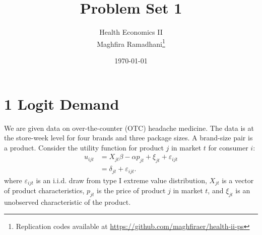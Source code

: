 \documentclass{article}
\begin{document}
 
\title{Problem Set 1}
\author{Health Economics II\\
Maghfira Ramadhani\footnote{Replication codes available at \url{https://github.com/maghfiraer/health-ii-ps}}}
\date{\today}
\maketitle

\section*{1 Logit Demand}

We are given data on over-the-counter (OTC) headache medicine. The data is at the store-week level for four brands and three package sizes. A brand-size pair is a product.
Consider the utility function for product $j$ in market $t$ for consumer $i$:
\begin{align*}
    u_{ijt} &=  X_{jt} \beta  - \alpha p_{jt}+ \xi_{jt} + \varepsilon_{ijt} \\
    &=\delta_{jt}+\varepsilon_{ijt}.
\end{align*}
where $\varepsilon_{ijt}$ is an i.i.d. draw from type I extreme value distribution, $X_{jt}$ is a vector of product characteristics, $p_{jt}$ is the price of product $j$ in market $t$, and $\xi_{jt}$ is an unobserved characteristic of the product.
\end{document}

